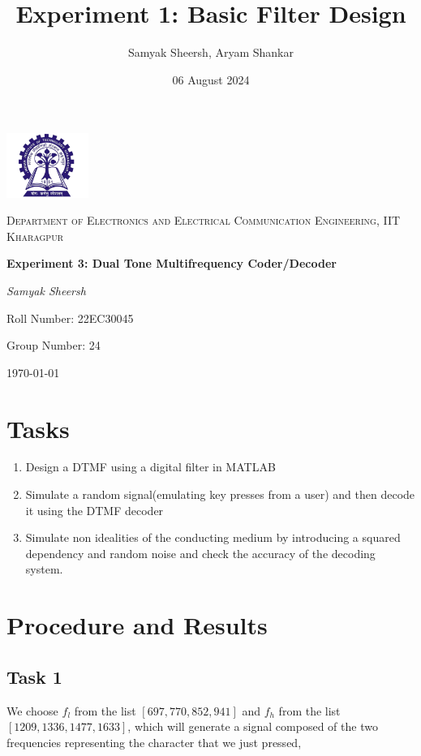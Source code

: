 \documentclass{article}
\title{Experiment 1: Basic Filter Design}
\author{Samyak Sheersh, Aryam Shankar}
\date{06 August 2024}
\begin{document}
\begin{titlepage}
    \centering
    \includegraphics[width=0.2\textwidth]{KGP_logo.png}\par\vspace{1cm}
    {\scshape\LARGE Department of Electronics and Electrical Communication Engineering, IIT Kharagpur\par}
    \vspace{1cm}
    {\huge\bfseries Experiment 3:  Dual Tone Multifrequency Coder/Decoder\par}
    \vspace{1.5cm}
    {\Large\itshape Samyak Sheersh \par}
    \vfill
    {\large Roll Number: 22EC30045\par}
    {\large Group Number: 24\par}
    \vfill
    {\large \today \par}
\end{titlepage}

\section{Tasks}
\begin{enumerate}
    \item Design a DTMF using a digital filter in MATLAB
    \item Simulate a random signal(emulating key presses from a user) and then decode it using the DTMF decoder
    \item Simulate non idealities of the conducting medium by introducing a squared dependency and random noise and check the accuracy of the decoding system.
\end{enumerate}

\section{Procedure and Results}
\subsection{Task 1}
We choose $f_l$ from the list $[697, 770,852,941]$ and  $f_h$ from the list $[1209, 1336, 1477, 1633]$, which will generate a signal composed of the two frequencies representing the character that we just pressed, 
\end{document}
